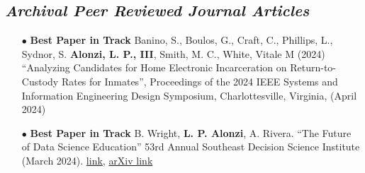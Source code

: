 \documentclass{article}[10pt]
\begin{document}
\subsection*{\emph{Archival Peer Reviewed Journal Articles}}
\begin{itemize}

\item [$\bullet$] {\bf \LARGE Best Paper in Track} Banino, S., Boulos, G., Craft, C., Phillips, L., Sydnor, S. {\bf Alonzi, L. P., III}, Smith, M. C., White, Vitale M (2024) “Analyzing Candidates for Home Electronic Incarceration on Return-to-Custody Rates for Inmates”, Proceedings of the 2024 IEEE Systems and Information Engineering Design Symposium, Charlottesville, Virginia, (April 2024)

\item [$\bullet$] {\bf \LARGE Best Paper in Track} B. Wright, {\bf L. P. Alonzi}, A. Rivera. “The Future of Data Science Education” 53rd Annual Southeast Decision Science Institute (March 2024). \href{https://sedsi.decisionsciences.org/wp-content/uploads/sites/7/2024/08/SEDSI-2024-Proceedings-2.pdf}{link}, \href{https://arxiv.org/abs/2407.11824.}{arXiv link}


\end{itemize}
\end{document}
